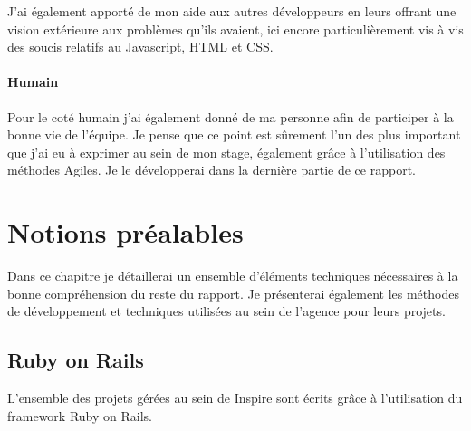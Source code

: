\documentclass[12pt,a4paper]{book}
\begin{document}
J'ai également apporté de mon aide aux autres développeurs en leurs offrant une vision extérieure aux problèmes qu'ils avaient, ici encore particulièrement vis à vis des soucis relatifs au Javascript, HTML et CSS. 

\subsubsection{Humain}

Pour le coté humain j'ai également donné de ma personne afin de participer à la bonne vie de l'équipe. Je pense que ce point est sûrement l'un des plus important que j'ai eu à exprimer au sein de mon stage, également grâce à l'utilisation des méthodes Agiles. Je le développerai dans la dernière partie de ce rapport.

\chapter{Notions préalables}

Dans ce chapitre je détaillerai un ensemble d'éléments techniques nécessaires à la bonne compréhension du reste du rapport. Je présenterai également les méthodes de développement et techniques utilisées au sein de l'agence pour leurs projets.

\section{Ruby on Rails}

L'ensemble des projets gérées au sein de Inspire sont écrits grâce à l'utilisation du framework Ruby on Rails.
\end{document}
